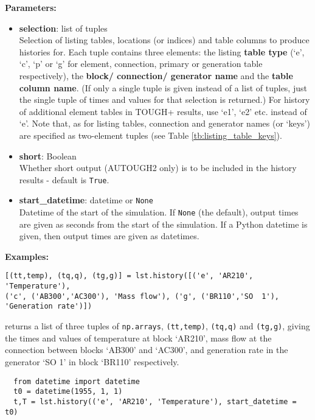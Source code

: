 \textbf{Parameters:}
\begin{itemize}

\item \textbf{selection}: list of tuples\\
  Selection of listing tables, locations (or indices) and table columns to produce histories for.  Each tuple contains three elements: the listing \textbf{table type} (`e', `c', `p' or `g' for element, connection, primary or generation table respectively), the \textbf{block/ connection/ generator name} and the \textbf{table column name}.  (If only a single tuple is given instead of a list of tuples, just the single tuple of times and values for that selection is returned.)  For history of additional element tables in TOUGH+ results, use `e1', `e2' etc. instead of `e'.  Note that, as for listing tables, connection and generator names (or `keys') are specified as two-element tuples (see Table \ref{tb:listing_table_keys}).

\item \textbf{short}: Boolean\\
  Whether short output (AUTOUGH2 only) is to be included in the history results - default is \texttt{True}.

\item \textbf{start\_datetime}: datetime or \texttt{None}\\
  Datetime of the start of the simulation. If \texttt{None} (the default), output times are given as seconds from the start of the simulation. If a Python datetime is given, then output times are given as datetimes.

\end{itemize}

\textbf{Examples:}

\begin{lstlisting}
[(tt,temp), (tq,q), (tg,g)] = lst.history([('e', 'AR210', 'Temperature'),
('c', ('AB300','AC300'), 'Mass flow'), ('g', ('BR110','SO  1'), 'Generation rate')])
\end{lstlisting}

returns a list of three tuples of \texttt{np.arrays}, \texttt{(tt,temp)}, \texttt{(tq,q)} and \texttt{(tg,g)}, giving the times and values of temperature at block `AR210', mass flow at the connection between blocks `AB300' and `AC300', and generation rate in the generator `SO  1' in block `BR110' respectively.

\begin{lstlisting}
  from datetime import datetime
  t0 = datetime(1955, 1, 1)
  t,T = lst.history(('e', 'AR210', 'Temperature'), start_datetime = t0)
\end{lstlisting}

